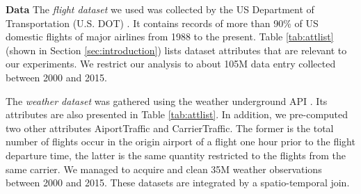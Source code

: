 
{\bf Data} The {\em flight dataset} we used was collected by the US
Department of Transportation (U.S. DOT) \cite{flightdata}. It contains
records of more than 90\% of US domestic flights of major airlines
from 1988 to the present. Table \ref{tab:attlist}(shown in Section
\ref{sec:introduction}) lists dataset attributes that are relevant to
our experiments.  We restrict our analysis to about 105M data entry
collected between 2000 and 2015.

The {\em weather dataset} was gathered using the weather underground
API \cite{Weatherdata}.  Its attributes are also presented in Table
\ref{tab:attlist}. In addition, we pre-computed two other attributes
AiportTraffic and CarrierTraffic. The former is the total number of
flights occur in the origin airport of a flight one hour prior to the
flight departure time, the latter is the same quantity restricted to
the flights from the same carrier.  We managed to acquire and clean
35M weather observations between 2000 and 2015. These datasets are
integrated by a spatio-temporal join.









